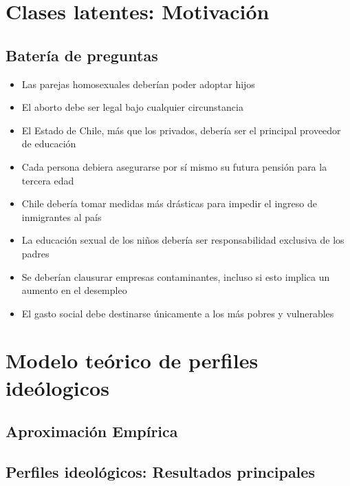 \documentclass[
  12pt,
  openany]{book}
\providecommand{\tightlist}{%
  \setlength{\itemsep}{0pt}\setlength{\parskip}{0pt}}
\begin{document}
\hypertarget{clases-latentes-motivaciuxf3n}{%
\section{Clases latentes: Motivación}\label{clases-latentes-motivaciuxf3n}}

\hypertarget{bateruxeda-de-preguntas}{%
\subsection{Batería de preguntas}\label{bateruxeda-de-preguntas}}

\begin{itemize}
\tightlist
\item
  Las parejas homosexuales deberían poder adoptar hijos
\item
  El aborto debe ser legal bajo cualquier circunstancia
\item
  El Estado de Chile, más que los privados, debería ser el principal proveedor de educación
\item
  Cada persona debiera asegurarse por sí mismo su futura pensión para la tercera edad
\item
  Chile debería tomar medidas más drásticas para impedir el ingreso de inmigrantes al país
\item
  La educación sexual de los niños debería ser responsabilidad exclusiva de los padres
\item
  Se deberían clausurar empresas contaminantes, incluso si esto implica un aumento en el desempleo
\item
  El gasto social debe destinarse únicamente a los más pobres y vulnerables
\end{itemize}

\hypertarget{modelo-teuxf3rico-de-perfiles-ideuxf3logicos}{%
\section{Modelo teórico de perfiles ideólogicos}\label{modelo-teuxf3rico-de-perfiles-ideuxf3logicos}}

\hypertarget{aproximaciuxf3n-empuxedrica}{%
\subsection{Aproximación Empírica}\label{aproximaciuxf3n-empuxedrica}}

\hypertarget{perfiles-ideoluxf3gicos-resultados-principales}{%
\subsection{Perfiles ideológicos: Resultados principales}\label{perfiles-ideoluxf3gicos-resultados-principales}}
\end{document}
